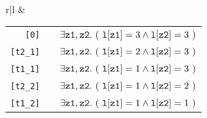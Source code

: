 \begin{frame}[fragile]
\begin{tabular}{r|l}
&

\begin{minipage}{.7\textwidth}
\begin{tabular}{rcl}
     \verb|[0]| & & $\exists {\tt z1}, {\tt z2}.\ (\ {\tt l[z1]}=3 \wedge {\tt l[z2]}=3\ )$ \\
 \pause
 \pause
 \verb|[t2_1]| & & $\exists {\tt z1}, {\tt z2}.\ (\ {\tt l[z1]}=2 \wedge {\tt l[z2]}=3\ )$ \\
 \pause
 \pause
 \verb|[t1_1]| & & $\exists {\tt z1}, {\tt z2}.\ (\ {\tt l[z1]}=1 \wedge {\tt l[z2]}=3\ )$ \\
 \pause
 \pause
 \verb|[t2_2]| & & $\exists {\tt z1}, {\tt z2}.\ (\ {\tt l[z1]}=1 \wedge {\tt l[z2]}=2\ )$ \\
 \pause
 \pause
 \verb|[t1_2]| & & $\exists {\tt z1}, {\tt z2}.\ (\ {\tt l[z1]}=1 \wedge {\tt l[z2]}=1\ )$
\end{tabular}
\end{minipage}

\end{tabular}

\end{frame}




